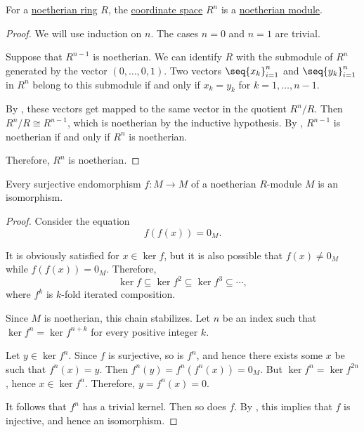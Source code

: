 \begin{proposition}\label{thm:noetherian_free_module}
  For a \hyperref[def:noetherian_semiring]{noetherian ring} \( R \), the \hyperref[def:sequence_space]{coordinate space} \( R^n \) is a \hyperref[def:noetherian_semimodule]{noetherian module}.
\end{proposition}
\begin{proof}
  We will use induction on \( n \). The cases \( n = 0 \) and \( n = 1 \) are trivial.

  Suppose that \( R^{n-1} \) is noetherian. We can identify \( R \) with the submodule of \( R^n \) generated by the vector \( (0, \ldots, 0, 1) \). Two vectors \( \seq{ x_k }_{i=1}^n \) and  \( \seq{ y_k }_{i=1}^n \) in \( R^n \) belong to this submodule if and only if \( x_k = y_k \) for \( k = 1, \ldots, n - 1 \).

  By , these vectors get mapped to the same vector in the quotient \( R^n / R \). Then \( R^n / R \cong R^{n-1} \), which is noetherian by the inductive hypothesis. By , \( R^{n-1} \) is noetherian if and only if \( R^n \) is noetherian.

  Therefore, \( R^n \) is noetherian.
\end{proof}

\begin{lemma}\label{thm:surjective_endomorphism_over_noetherian_module}
  Every surjective endomorphism \( f: M \to M \) of a noetherian \( R \)-module \( M \) is an isomorphism.
\end{lemma}
\begin{proof}
  Consider the equation
  \begin{equation*}
    f(f(x)) = 0_M.
  \end{equation*}

  It is obviously satisfied for \( x \in \ker f \), but it is also possible that \( f(x) \neq 0_M \) while \( f(f(x)) = 0_M \). Therefore,
  \begin{equation*}
    \ker f \subseteq \ker f^2 \subseteq \ker f^3 \subseteq \cdots,
  \end{equation*}
  where \( f^k \) is \( k \)-fold iterated composition.

  Since \( M \) is noetherian, this chain stabilizes. Let \( n \) be an index such that \( \ker f^n = \ker f^{n + k} \) for every positive integer \( k \).

  Let \( y \in \ker f^n \). Since \( f \) is surjective, so is \( f^n \), and hence there exists some \( x \) be such that \( f^n(x) = y \). Then \( f^n(y) = f^n(f^n(x)) = 0_M \). But \( \ker f^n = \ker f^{2n} \), hence \( x \in \ker f^n \). Therefore, \( y = f^n(x) = 0 \).

  It follows that \( f^n \) has a trivial kernel. Then so does \( f \). By , this implies that \( f \) is injective, and hence an isomorphism.
\end{proof}

